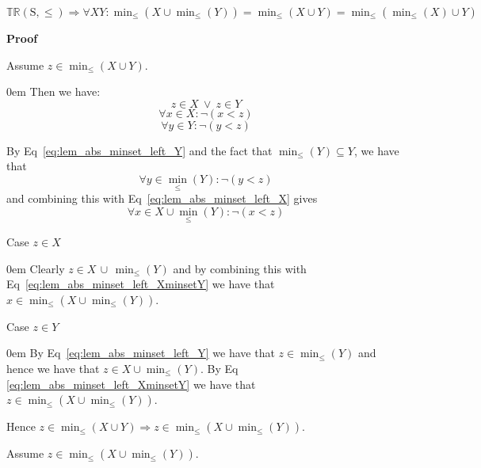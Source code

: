 \documentclass[10pt]{article}
\newcommand{\propname}[1]{{\mathbb{#1}}}
\newcommand{\proof}{\vspace{1em} \textbf{Proof} \vspace{1em}}
\newenvironment{ind}[0]{\begin{addmargin}[1em]{0em}\vspace{0.5em}}{\end{addmargin}\vspace{0.5em}}
\begin{document}
$\propname{TR}(\mathrm{S, \leq}) \Rightarrow \forall X Y : \min_\leq(X \cup \min_\leq(Y)) = \min_\leq(X \cup Y) = \min_\leq(\min_\leq(X) \cup Y)$

\proof

Assume $z \in \min_\leq(X \cup Y)$. 
\begin{ind}
Then we have:
\begin{equation}
z \in X \ \vee \ z \in Y
\end{equation}
\begin{equation} \label{eq:lem_abs_minset_left_X}
\forall x \in X : \neg (x < z)
\end{equation}
\begin{equation} \label{eq:lem_abs_minset_left_Y}
\forall y \in Y : \neg (y < z)
\end{equation}

By Eq~\ref{eq:lem_abs_minset_left_Y} and the fact that $\min_\leq(Y) \subseteq Y$, we have that
\begin{equation*} 
\forall y \in \min_\leq(Y) : \neg (y < z)
\end{equation*}
and combining this with Eq~\ref{eq:lem_abs_minset_left_X} gives
\begin{equation} \label{eq:lem_abs_minset_left_XminsetY}
\forall x \in X \cup \min_\leq(Y) : \neg (x < z)
\end{equation}

Case $z \in X$
\begin{ind}
Clearly $z \in X \, \cup \, \min_\leq(Y)$ and by combining this with Eq~\ref{eq:lem_abs_minset_left_XminsetY} we have that $x \in \min_\leq(X \cup \min_\leq(Y))$.
\end{ind}

Case $z \in Y$
\begin{ind}
By Eq~\ref{eq:lem_abs_minset_left_Y} we have that $z \in \min_\leq(Y)$ and hence we have that $z \in X \cup \min_\leq(Y)$. By Eq \ref{eq:lem_abs_minset_left_XminsetY} we have that $z \in \min_\leq(X \cup \min_\leq(Y))$.
\end{ind}

Hence $z \in \min_\leq(X \cup Y) \Rightarrow z \in \min_\leq(X \cup \min_\leq(Y))$.
\end{ind}

\vspace{2em}

Assume $z \in \min_\leq(X \cup \min_\leq(Y))$.
\end{document}
